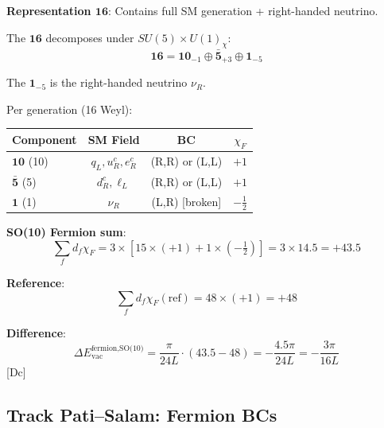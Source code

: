 \documentclass[11pt,a4paper]{article}
\newcommand{\tagDc}{\textcolor{blue!50!black}{[Dc]}}
\begin{document}
\begin{trackbox}
\textbf{Representation $\mathbf{16}$}: Contains full SM generation + right-handed neutrino.

The $\mathbf{16}$ decomposes under $SU(5) \times U(1)_\chi$:
\begin{equation}
\label{eq:16-decomp}
\mathbf{16} = \mathbf{10}_{-1} \oplus \bar{\mathbf{5}}_{+3} \oplus \mathbf{1}_{-5}
\end{equation}

The $\mathbf{1}_{-5}$ is the right-handed neutrino $\nu_R$.

Per generation (16 Weyl):
\begin{center}
\begin{tabular}{lccc}
\toprule
Component & SM Field & BC & $\chi_F$ \\
\midrule
$\mathbf{10}$ (10) & $q_L, u_R^c, e_R^c$ & (R,R) or (L,L) & $+1$ \\
$\bar{\mathbf{5}}$ (5) & $d_R^c, \ell_L$ & (R,R) or (L,L) & $+1$ \\
$\mathbf{1}$ (1) & $\nu_R$ & (L,R) [broken] & $-\frac{1}{2}$ \\
\bottomrule
\end{tabular}
\end{center}

\textbf{SO(10) Fermion sum}:
\begin{equation}
\label{eq:so10-ferm-sum}
\sum_f d_f \chi_F = 3 \times [15 \times (+1) + 1 \times (-\tfrac{1}{2})] = 3 \times 14.5 = +43.5
\end{equation}

\textbf{Reference}:
\begin{equation}
\label{eq:so10-ferm-ref}
\sum_f d_f \chi_F(\text{ref}) = 48 \times (+1) = +48
\end{equation}

\textbf{Difference}:
\begin{equation}
\label{eq:so10-ferm-diff}
\Delta E_{\text{vac}}^{\text{fermion,SO(10)}} = \frac{\pi}{24L} \cdot (43.5 - 48) = -\frac{4.5\pi}{24L} = -\frac{3\pi}{16L}
\end{equation}
\tagDc
\end{trackbox}

\subsection{Track Pati--Salam: Fermion BCs}
\end{document}
